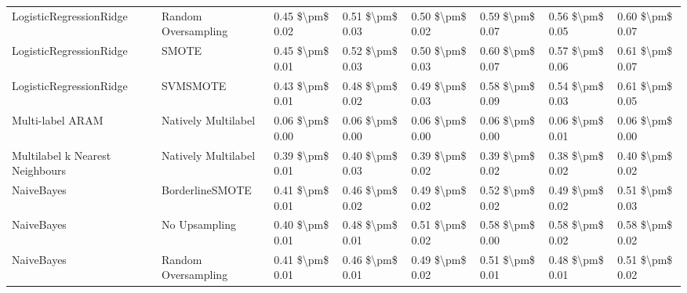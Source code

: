 \begin{tabular}{llllllll}
        LogisticRegressionRidge &           Random Oversampling & 0.45 \$\textbackslash pm\$ 0.02 &           0.51 \$\textbackslash pm\$ 0.03 &       0.50 \$\textbackslash pm\$ 0.02 &        0.59 \$\textbackslash pm\$ 0.07 &                         0.56 \$\textbackslash pm\$ 0.05 &     0.60 \$\textbackslash pm\$ 0.07 \\
        LogisticRegressionRidge &                         SMOTE & 0.45 \$\textbackslash pm\$ 0.01 &           0.52 \$\textbackslash pm\$ 0.03 &       0.50 \$\textbackslash pm\$ 0.03 &        0.60 \$\textbackslash pm\$ 0.07 &                         0.57 \$\textbackslash pm\$ 0.06 &     0.61 \$\textbackslash pm\$ 0.07 \\
        LogisticRegressionRidge &                      SVMSMOTE & 0.43 \$\textbackslash pm\$ 0.01 &           0.48 \$\textbackslash pm\$ 0.02 &       0.49 \$\textbackslash pm\$ 0.03 &        0.58 \$\textbackslash pm\$ 0.09 &                         0.54 \$\textbackslash pm\$ 0.03 &     0.61 \$\textbackslash pm\$ 0.05 \\
               Multi-label ARAM &           Natively Multilabel & 0.06 \$\textbackslash pm\$ 0.00 &           0.06 \$\textbackslash pm\$ 0.00 &       0.06 \$\textbackslash pm\$ 0.00 &        0.06 \$\textbackslash pm\$ 0.00 &                         0.06 \$\textbackslash pm\$ 0.01 &     0.06 \$\textbackslash pm\$ 0.00 \\
Multilabel k Nearest Neighbours &           Natively Multilabel & 0.39 \$\textbackslash pm\$ 0.01 &           0.40 \$\textbackslash pm\$ 0.03 &       0.39 \$\textbackslash pm\$ 0.02 &        0.39 \$\textbackslash pm\$ 0.02 &                         0.38 \$\textbackslash pm\$ 0.02 &     0.40 \$\textbackslash pm\$ 0.02 \\
                     NaiveBayes &               BorderlineSMOTE & 0.41 \$\textbackslash pm\$ 0.01 &           0.46 \$\textbackslash pm\$ 0.02 &       0.49 \$\textbackslash pm\$ 0.02 &        0.52 \$\textbackslash pm\$ 0.02 &                         0.49 \$\textbackslash pm\$ 0.02 &     0.51 \$\textbackslash pm\$ 0.03 \\
                     NaiveBayes &                 No Upsampling & 0.40 \$\textbackslash pm\$ 0.01 &           0.48 \$\textbackslash pm\$ 0.01 &       0.51 \$\textbackslash pm\$ 0.02 &        0.58 \$\textbackslash pm\$ 0.00 &                         0.58 \$\textbackslash pm\$ 0.02 &     0.58 \$\textbackslash pm\$ 0.02 \\
                     NaiveBayes &           Random Oversampling & 0.41 \$\textbackslash pm\$ 0.01 &           0.46 \$\textbackslash pm\$ 0.01 &       0.49 \$\textbackslash pm\$ 0.02 &        0.51 \$\textbackslash pm\$ 0.01 &                         0.48 \$\textbackslash pm\$ 0.01 &     0.51 \$\textbackslash pm\$ 0.02 \\

\end{tabular}
